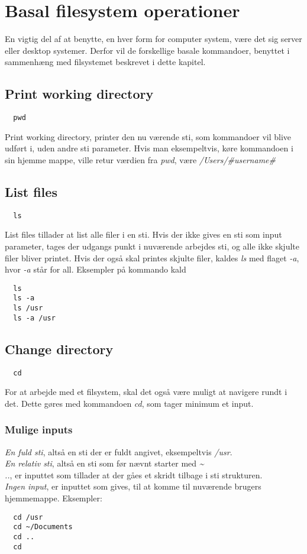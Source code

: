 \chapter{Basal filesystem operationer}
En vigtig del af at benytte, en hver form for computer system, være det sig server eller desktop systemer.
Derfor vil de forskellige basale kommandoer, benyttet i sammenhæng med filsystemet beskrevet i dette kapitel.
\section{Print working directory}
\begin{lstlisting}
  pwd
\end{lstlisting}
Print working directory, printer den nu værende sti, som kommandoer vil blive udført i, uden andre sti parameter.
Hvis man eksempeltvis, køre kommandoen i sin hjemme mappe, ville retur værdien fra \emph{pwd}, være \emph{/Users/\#username\#}
\section{List files}
\begin{lstlisting}
  ls
\end{lstlisting}
List files tillader at list alle filer i en sti. Hvis der ikke gives en sti som input parameter, tages der udgangs punkt
i nuværende arbejdes sti, og alle ikke skjulte filer bliver printet. Hvis der også skal printes skjulte filer, kaldes
\emph{ls} med flaget \emph{-a}, hvor \emph{-a} står for all. Eksempler på kommando kald
\begin{lstlisting}
  ls
  ls -a
  ls /usr
  ls -a /usr
\end{lstlisting}
\section{Change directory}
\begin{lstlisting}
  cd
\end{lstlisting}
For at arbejde med et filsystem, skal det også være muligt at navigere
rundt i det. Dette gøres med kommandoen \emph{cd}, som tager minimum et
input.
\subsection*{Mulige inputs}
\emph{En fuld sti}, altså en sti der er fuldt angivet, eksempeltvis \emph{/usr}. \\
\emph{En relativ sti}, altså en sti som før nævnt starter med \emph{\textasciitilde}\\
\emph{..}, er inputtet som tillader at der gåes et skridt tilbage i sti strukturen. \\
\emph{Ingen input}, er inputtet som gives, til at komme til nuværende
brugers hjemmemappe. Eksempler:
\begin{lstlisting}
  cd /usr
  cd ~/Documents
  cd ..
  cd
\end{lstlisting}
